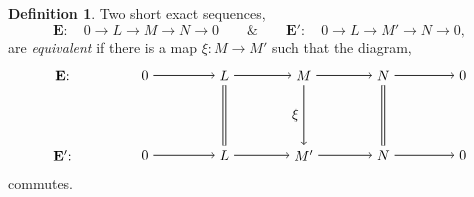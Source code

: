 \documentclass[11.5pt, twoside, a4paper, titlepage]{report}
\theoremstyle{definition}
\newtheorem{mydef}{Definition}[section]
\theoremstyle{plain}
\begin{document}
\begin{mydef}
Two short exact sequences,
\begin{equation*}
\mathbf{E}: \quad 0\xrightarrow{}L\xrightarrow{}M\xrightarrow{}N\xrightarrow{}0 \qquad \& \qquad \mathbf{E'}: \quad 0\xrightarrow{}L\xrightarrow{}M'\xrightarrow{}N\xrightarrow{}0 ,
\end{equation*}
are \emph{equivalent} if there is a map $\xi: M \to M'$ such that the diagram,
\begin{equation*}
\begin{tikzpicture}[->,-latex, auto, main path/.style={->, semithick}, main node/.style={}]
\node	[main node]		(1) at (0,0)		{$\mathbf{E}$: \quad };
\node	[main node]		(2) at (2,0)		{$0$};
\node	[main node]		(3) at (4,0)		{$L$};
\node [main node]		(4) at (6,0)		{$M$};
\node [main node]		(5) at (8,0)		{$N$};
\node	[main node]		(11) at (10,0)	{$0$};

\node	[main node]		(6) at (0,-2)		{$\mathbf{E'}$: \quad};
\node	[main node]		(7) at (2,-2)		{$0$};
\node	[main node]		(8) at (4,-2)		{$L$};
\node [main node]		(9) at (6,-2)		{$M'$};
\node [main node]		(10) at (8,-2)	{$N$};
\node [main node]		(13) at (10,-2)	{$0$};

\draw (2) edge [main path] node [auto] {$$} (3);
\draw (3) edge [main path] node [auto] {$$} (4);
\draw (4) edge [main path] node [auto] {$$} (5);
\draw (5) edge [main path] (11);

\draw (7) edge [main path] node [auto] {$$} (8);
\draw (8) edge [main path] node [auto] {$$} (9);
\draw (9) edge [main path] node [auto] {$$} (10);
\draw (10) edge [main path] (13);

\draw (3) edge [-, semithick, double, double distance=1.5pt] (8);
\draw (4) edge [main path] node [auto, swap] {$\xi$} (9);
\draw (5) edge [-, semithick, double, double distance=1.5pt](10);
\end{tikzpicture}
\end{equation*}
commutes.
\end{mydef}
\end{document}
